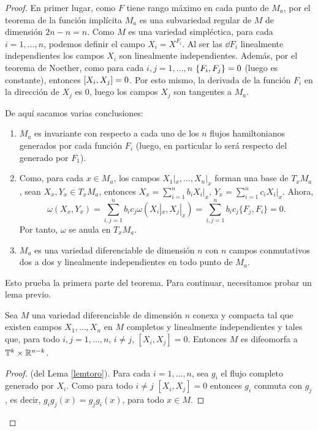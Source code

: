  \begin{proof}
  En primer lugar, como $F$ tiene rango máximo en cada punto de $M_a$, por el teorema de la función implícita $M_a$ es una subvariedad regular de $M$ de dimensión $2n-n=n$. 
  Como $M$ es una variedad simpléctica, para cada $i=1,\dots,n$, podemos definir el campo $X_i=X^{F_i}$. Al ser las $\dd F_i$ linealmente independientes los campos $X_i$ son linealmente independientes. Además, por el teorema de Noether, como para cada $i,j= 1,\dots,n$ $\left\lbrace F_i,F_j\right\rbrace=0$ (luego es constante), entonces $\left[X_i,X_j\right]=0$. Por esto mismo, la derivada de la función $F_i$ en la dirección de $X_j$ es 0, luego los campos $X_j$ son tangentes a $M_a$.

  De aquí sacamos varias conclusiones:
  \begin{enumerate}
    \item $M_a$ es invariante con respecto a cada uno de los $n$ flujos hamiltonianos generados por cada función $F_i$ (luego, en particular lo será respecto del generado por $F_1$).
    \item Como, para cada $x \in M_a$, los campos $X_1|_x,\dots, X_n|_x$ forman una base de $T_x M_a$, sean $X_x, Y_x \in T_x M_a$, entonces $X_x = \sum_{i=1}^n b_i X_i|_x$, $Y_x=\sum_{i=1}^n c_i X_i|_x$. Ahora,
      \[
	\omega(X_x,Y_x)= \sum_{i,j=1}^n b_i c_j \omega(X_i|_x,X_j|_x) = \sum_{i,j=1}^n b_i c_j \{F_j,F_i\} = 0.
      \]
      Por tanto, $\omega$ se anula en $T_x M_a$. 
    \item $M_a$ es una variedad diferenciable de dimensión $n$ con $n$ campos conmutativos dos a dos y linealmente independientes en todo punto de $M_a$. 
  \end{enumerate}

  Esto prueba la primera parte del teorema. Para continuar, necesitamos probar un lema previo.

  \begin{lema}\label{lemtoro}
    Sea $M$ una variedad diferenciable de dimensión $n$ conexa y compacta tal que existen campos $X_1,\dots,X_n$ en $M$ completos y linealmente independientes y tales que, para todo $i,j=1,\dots,n$, $i\neq j$, $[X_i,X_j]=0$. Entonces $M$ es difeomorfa a $\mathbb{T}^k\times \mathbb{R}^{n-k}$. 
\end{lema}
\begin{proof}(del Lema \ref{lemtoro}).
  Para cada $i=1,\dots,n$, sea $g_i$ el flujo completo generado por $X_i$. Como para todo $i\neq j$ $[X_i,X_j]=0 $ entonces $g_i$ conmuta con $g_j$, es decir, $g_ig_j (x)=g_jg_i (x)$, para todo $x \in M$. 


\end{proof}
\end{proof}

